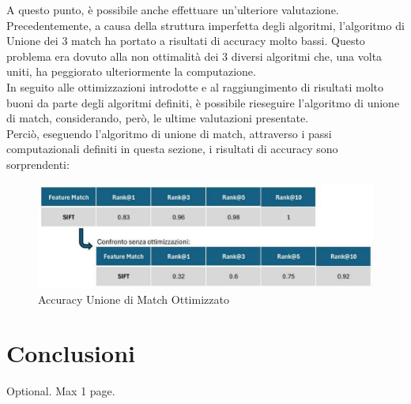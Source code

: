 \documentclass[12pt,a4paper,openright,twoside]{book}
\begin{document}
A questo punto, è possibile anche effettuare un'ulteriore valutazione. Precedentemente, a causa della struttura imperfetta degli algoritmi, l'algoritmo di Unione dei 3 match ha portato a risultati di accuracy molto bassi. Questo problema era dovuto alla non ottimalità dei 3 diversi algoritmi che, una volta uniti, ha peggiorato ulteriormente la computazione.\\
In seguito alle ottimizzazioni introdotte e al raggiungimento di risultati molto buoni da parte degli algoritmi definiti, è possibile rieseguire l'algoritmo di unione di match, considerando, però, le ultime valutazioni presentate.\\
Perciò, eseguendo l'algoritmo di unione di match, attraverso i passi computazionali definiti in questa sezione, i risultati di accuracy sono sorprendenti:
\begin{figure}[H]
	\centering
	\includegraphics[width=16cm]{figures/3match_1.pdf}
    	\caption{Accuracy Unione di Match Ottimizzato}
	\label{fig:unioneopt}
\end{figure}

\chapter{Conclusioni}


%
%
%
%


\backmatter

\nocite{*} %




\begin{acknowledgements} %
Optional. Max 1 page.
\end{acknowledgements}
\end{document}

